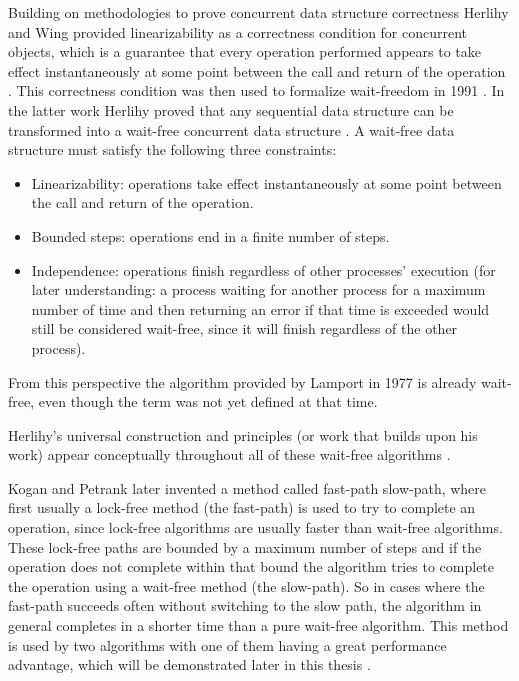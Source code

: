 Building on methodologies to prove concurrent data structure correctness Herlihy and Wing provided linearizability as a correctness condition for concurrent objects, which is a guarantee that every operation performed appears to take effect instantaneously at some point between the call and return of the operation \cite{HerlihyLinearizability}. This correctness condition was then used to formalize wait-freedom in 1991 \cite{herlihy1991wait}. In the latter work Herlihy proved that any sequential data structure can be transformed into a wait-free concurrent data structure \cite{herlihy1991wait}. A wait-free data structure must satisfy the following three constraints: 
\begin{itemize}
   \item Linearizability: operations take effect instantaneously at some point between the call and return of the operation.
   \item Bounded steps: operations end in a finite number of steps.
   \item Independence: operations finish regardless of other processes' execution (for later understanding: a process waiting for another process for a maximum number of time and then returning an error if that time is exceeded would still be considered wait-free, since it will finish regardless of the other process).
\end{itemize}
From this perspective the algorithm provided by Lamport in 1977 is already wait-free, even though the term was not yet defined at that time. \cite{herlihy1991wait,HerlihyLinearizability}

Herlihy's universal construction and principles (or work that builds upon his work) appear conceptually throughout all of these wait-free algorithms \cite{Kogan2011WaitFreeQueues,FeldmanDechev2015WaitFreeRingBuffer,kogan2012methodology,FeldmanDechevV2,FeldmanDechevV3,RamalheteQueue,wCQWaitFreeQueue,Verma2013Scalable,FastFetchAndAddWaitFreeQueue,WangCacheCoherent,adampsc,jiffy,JayantiLog,Drescher2015GuardedSections,Mateíspmc,torquati2010singleproducersingleconsumerqueuessharedcache,Aldinucci2012EfficientSync,Wang2013BQueue,MaffioneCacheAware,ffq}. \cite{herlihy1991wait}

Kogan and Petrank later invented a method called fast-path slow-path, where first usually a lock-free method (the fast-path) is used to try to complete an operation, since lock-free algorithms are usually faster than wait-free algorithms. These lock-free paths are bounded by a maximum number of steps and if the operation does not complete within that bound the algorithm tries to complete the operation using a wait-free method (the slow-path). So in cases where the fast-path succeeds often without switching to the slow path, the algorithm in general completes in a shorter time than a pure wait-free algorithm. This method is used by two algorithms with one of them having a great performance advantage, which will be demonstrated later in this thesis \cite{wCQWaitFreeQueue,FastFetchAndAddWaitFreeQueue}. \cite{kogan2012methodology}